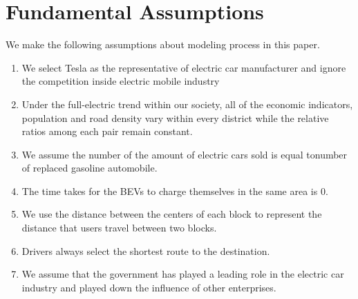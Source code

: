 \documentclass{mcmthesis}
\begin{document}
\section{Fundamental  Assumptions}
We make the following assumptions about modeling process in this paper.
\begin{enumerate}[1.]
	\item We select Tesla as the representative of electric car manufacturer and ignore the competition inside electric mobile industry
	\item Under the full-electric trend within our society, all of the economic indicators, population and road density vary within every district while the relative ratios among each pair remain constant.
	\item We assume the number of the amount of electric cars sold is equal tonumber of replaced gasoline automobile.
	\item The time takes for the BEVs to charge themselves in the same area is 0.
	\item We use the distance between the centers of each block to represent the distance that users travel between two blocks. 
	\item Drivers always select the shortest route to the destination.
	\item We assume that the government has played a leading role in the electric car industry and played down the influence of other enterprises.
\end{enumerate}
\end{document}
